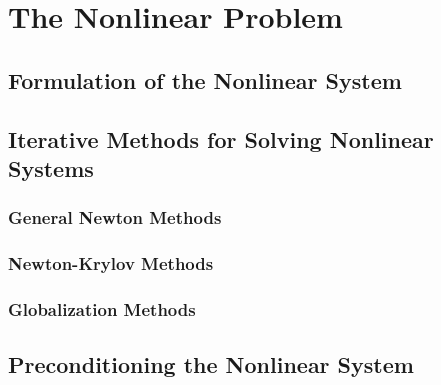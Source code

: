 \chapter{The Nonlinear Problem}
\label{ch:nonlinear_problem}

\section{Formulation of the Nonlinear System}
\label{sec:nonlinear_system}

\section{Iterative Methods for Solving Nonlinear Systems}
\label{sec:nonlinear_methods}

\subsection{General Newton Methods}
\label{subsec:newton_methods}

\subsection{Newton-Krylov Methods}
\label{subsec:newton_krylov_methods}

\subsection{Globalization Methods}
\label{subsec:globalization_methods}

\section{Preconditioning the Nonlinear System}
\label{sec:nonlinear_preconditioning}
